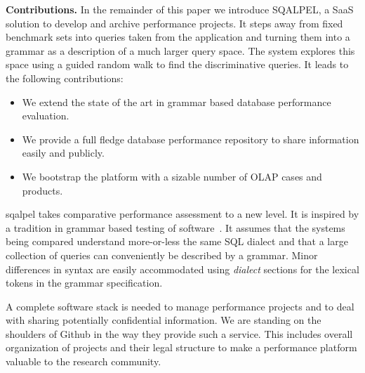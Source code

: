 \documentclass{cidr-2019}
\begin{document}
{\bf Contributions.} In the remainder of this paper we introduce {\sc
  SQALPEL}, a SaaS solution to develop and archive performance
projects.
It steps away from fixed benchmark sets into queries taken from the
application and turning them into a grammar as a description of a much
larger query space. The system explores this space using a guided
random walk to find the discriminative queries. It leads to the
following contributions:

\begin{itemize}
	\item We extend the state of the art in grammar based database
          performance evaluation.
	\item We provide a full fledge database performance repository
          to share information easily and publicly.
	\item We bootstrap the platform with a sizable number of OLAP
          cases and products.
\end{itemize}

{\sc sqalpel} takes comparative performance assessment to a new
level. It is inspired by a tradition in grammar based testing of
software~\cite{10.1007/11754008_2}. It assumes that the systems being
compared understand more-or-less the same SQL dialect and that a large
collection of queries can conveniently be described by a
grammar. Minor differences in syntax are easily accommodated using
\emph{dialect} sections for the lexical tokens in the grammar specification.

A complete software stack is needed to manage performance projects and
to deal with sharing potentially confidential information. We are
standing on the shoulders of Github in the way they provide such a
service. This includes overall organization of projects and their
legal structure to make a performance platform valuable to the
research community.

\end{document}
